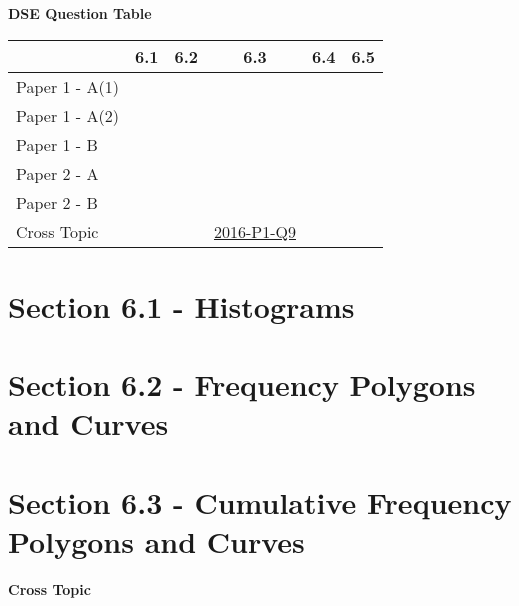 \documentclass[12pt, a4paper]{article}
\begin{document}
\begin{absolutelynopagebreak}
\begin{center}
\textbf{DSE Question Table}
\end{center}
\begin{center}
\begin{tabular}{|l|c|c|c|c|c|}
\hline
        & 6.1 & 6.2 & 6.3 & 6.4 & 6.5 \\\hline
\hline
Paper 1 - A(1)&  &  &  &  &  \\
\hline
Paper 1 - A(2)&  &  &  &  &  \\
\hline
Paper 1 - B&  &  &  &  &  \\
\hline
\hline
Paper 2 - A&  &  &  &  &  \\
\hline
Paper 2 - B&  &  &  &  &  \\
\hline
\hline
Cross Topic&  &  & \hyperref[DSE2016-CoreP1-Q09]{2016-P1-Q9} &  &  \\
\hline
\end{tabular}
\end{center}
\end{absolutelynopagebreak}




\section*{Section 6.1 - Histograms}\label{section:2-6-1}





\section*{Section 6.2 - Frequency Polygons and Curves}\label{section:2-6-2}





\section*{Section 6.3 - Cumulative Frequency Polygons and Curves}\label{section:2-6-3}

\textbf{Cross Topic}
\begin{enumx}[label=\arabic*.,start=1]
\item {}\label{DSE2016-CoreP1-Q09} 
\end{enumx}
\end{document}

